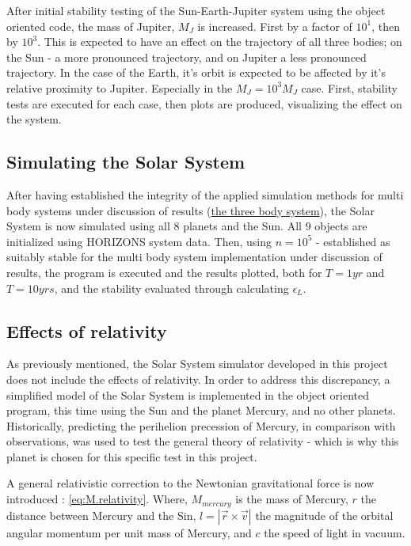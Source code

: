 \documentclass[%
oneside,                 %
final,                   %
10pt]{article}
\begin{document}
After initial stability testing of the Sun-Earth-Jupiter system using the object oriented code, the mass of Jupiter, $M_J$ is increased. First by a factor of $10^1$, then by $10^3$. This is expected to have an effect on the trajectory of all three bodies; on the Sun - a more pronounced trajectory, and on Jupiter a less pronounced trajectory. In the case of the Earth, it's orbit is expected to be affected by it's relative proximity to Jupiter. Especially in the $M_J=10^3 M_J$ case. First, stability tests are executed for each case, then plots are produced, visualizing the effect on the system.
  
\subsection{Simulating the Solar System}
After having established the integrity of the applied simulation methods for multi body systems under discussion of results (\hyperref[subsec:Discofres:3B]{the three body system}), the Solar System is now simulated using all $8$ planets and the Sun. All $9$ objects are initialized using HORIZONS system data. Then, using $n=10^5$ - established as suitably stable for the multi body system implementation under discussion of results, the program is executed and the results plotted, both for $T=1yr$ and $T=10yrs$, and the stability evaluated through calculating $\epsilon_L$. 

 
\subsection{Effects of relativity}
\label{sec:M.effectsofrel}
As previously mentioned, the Solar System simulator developed in this project does not include the effects of relativity. In order to address this discrepancy, a simplified model of the Solar System is implemented in the object oriented program, this time using the Sun and the planet Mercury, and no other planets. Historically, predicting the perihelion precession of Mercury, in comparison with observations, was used to test the general theory of relativity - which is why this planet is chosen for this specific test in this project. \newline

A general relativistic correction to the Newtonian gravitational force is now introduced \cite{HJ-expaper}: \eqref{eq:M.relativity}. Where, $M_{mercury}$ is the mass of Mercury, $r$ the distance between Mercury and the Sin, $l=|\vec{r}\times \vec{v}|$ the magnitude of the orbital angular momentum per unit mass of Mercury, and $c$ the speed of light in vacuum. 
\end{document}
